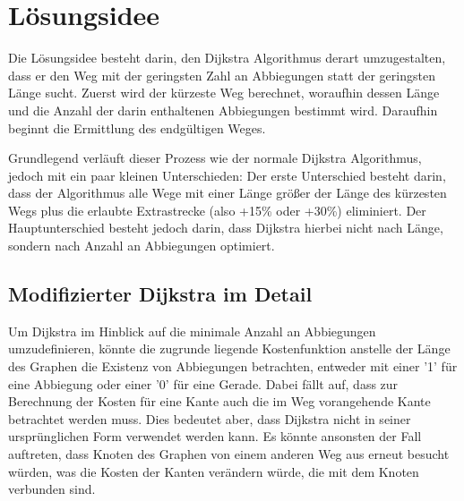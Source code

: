 \documentclass{article}
\theoremstyle{nonumberplain}
\begin{document}
    
\section{Lösungsidee}

Die Lösungsidee besteht darin, den Dijkstra Algorithmus derart umzugestalten, dass er den Weg mit der geringsten Zahl an Abbiegungen statt der geringsten Länge sucht.
Zuerst wird der kürzeste Weg berechnet, woraufhin dessen Länge und die Anzahl der darin enthaltenen Abbiegungen bestimmt wird. Daraufhin beginnt die Ermittlung des endgültigen Weges.

Grundlegend verläuft dieser Prozess wie der normale Dijkstra Algorithmus, jedoch mit ein paar kleinen Unterschieden:
Der erste Unterschied besteht darin, dass der Algorithmus alle Wege mit einer Länge größer der Länge des kürzesten Wegs plus die erlaubte Extrastrecke (also +15\% oder +30\%) eliminiert.
Der Hauptunterschied besteht jedoch darin, dass Dijkstra hierbei nicht nach Länge, sondern nach Anzahl an Abbiegungen optimiert.

\subsection{Modifizierter Dijkstra im Detail}

Um Dijkstra im Hinblick auf die minimale Anzahl an Abbiegungen umzudefinieren, könnte die zugrunde liegende Kostenfunktion anstelle der Länge des Graphen die Existenz von Abbiegungen betrachten, entweder mit einer '1' für eine Abbiegung oder einer '0' für eine Gerade. 
Dabei fällt auf, dass zur Berechnung der Kosten für eine Kante auch die im Weg vorangehende Kante betrachtet werden muss.
Dies bedeutet aber, dass Dijkstra nicht in seiner ursprünglichen Form verwendet werden kann. Es könnte ansonsten der Fall auftreten, dass Knoten des Graphen von einem anderen Weg aus erneut besucht würden, was die Kosten der Kanten verändern würde, die mit dem Knoten verbunden sind.

\begin{center}
\end{center}
\end{document}

